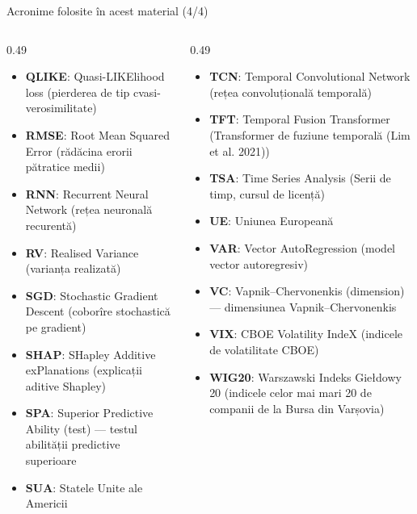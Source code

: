 \begin{frame}{Acronime folosite în acest material (4/4)}
\begin{columns}[T]
\begin{column}{0.49\textwidth}
\begin{itemize}\setlength{\itemsep}{0pt}
    \item \textbf{QLIKE}: Quasi-LIKElihood loss (pierderea de tip cvasi-verosimilitate)
    \item \textbf{RMSE}: Root Mean Squared Error (rădăcina erorii pătratice medii)
    \item \textbf{RNN}: Recurrent Neural Network (rețea neuronală recurentă)
    \item \textbf{RV}: Realised Variance (varianța realizată)
    \item \textbf{SGD}: Stochastic Gradient Descent (coborîre stochastică pe gradient)
    \item \textbf{SHAP}: SHapley Additive exPlanations (explicații aditive Shapley)
    \item \textbf{SPA}: Superior Predictive Ability (test) — testul abilității predictive superioare
    \item \textbf{SUA}: Statele Unite ale Americii
\end{itemize}
\end{column}
\begin{column}{0.49\textwidth}
\begin{itemize}\setlength{\itemsep}{0pt}
    \item \textbf{TCN}: Temporal Convolutional Network (rețea convoluțională temporală)
    \item \textbf{TFT}: Temporal Fusion Transformer (Transformer de fuziune temporală (Lim et al. 2021))
    \item \textbf{TSA}: Time Series Analysis (Serii de timp, cursul de licență)
    \item \textbf{UE}: Uniunea Europeană
    \item \textbf{VAR}: Vector AutoRegression (model vector autoregresiv)
    \item \textbf{VC}: Vapnik–Chervonenkis (dimension) — dimensiunea Vapnik–Chervonenkis
    \item \textbf{VIX}: CBOE Volatility IndeX (indicele de volatilitate CBOE)
    \item \textbf{WIG20}: Warszawski Indeks Giełdowy 20 (indicele celor mai mari 20 de companii de la Bursa din Varșovia)
\end{itemize}
\end{column}
\end{columns}
\end{frame}

